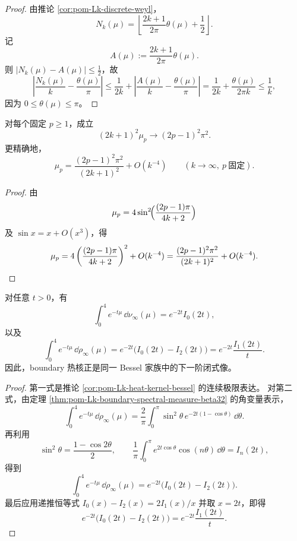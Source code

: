 \begin{proof}
由推论 \ref{cor:pom-Lk-discrete-weyl}，
\[
N_k(\mu)=\left\lfloor \frac{2k+1}{2\pi}\theta(\mu)+\frac12\right\rfloor.
\]
记
\[
A(\mu):=\frac{2k+1}{2\pi}\theta(\mu).
\]
则 \(|N_k(\mu)-A(\mu)|\le \frac12\)，故
\[
\left|\frac{N_k(\mu)}{k}-\frac{\theta(\mu)}{\pi}\right|
\le
\frac{1}{2k}
+
\left|\frac{A(\mu)}{k}-\frac{\theta(\mu)}{\pi}\right|
=
\frac{1}{2k}+\frac{\theta(\mu)}{2\pi k}
\le \frac{1}{k},
\]
因为 \(0\le \theta(\mu)\le \pi\)。
\end{proof}

\begin{corollary}[固定量子编号的硬边极限]\label{cor:conclusion-Lk-fixed-index-hard-edge}
对每个固定 \(p\ge 1\)，成立
\[
(2k+1)^2\mu_p\longrightarrow (2p-1)^2\pi^2.
\]
更精确地，
\[
\mu_p=
\frac{(2p-1)^2\pi^2}{(2k+1)^2}+O(k^{-4})
\qquad
(k\to\infty,\ p\ \text{固定}).
\]
\end{corollary}

\begin{proof}
由
\[
\mu_p=4\sin^2\!\Bigl(\frac{(2p-1)\pi}{4k+2}\Bigr)
\]
及 \(\sin x=x+O(x^3)\)，得
\[
\mu_p=
4\left(\frac{(2p-1)\pi}{4k+2}\right)^2+O(k^{-4})
=
\frac{(2p-1)^2\pi^2}{(2k+1)^2}+O(k^{-4}).
\qedhere
\]
\end{proof}

\begin{theorem}\label{thm:conclusion-Lk-bulk-boundary-bessel-duality}
对任意 \(t>0\)，有
\[
\int_0^4 e^{-t\mu}\,\dd\nu_\infty(\mu)=e^{-2t}I_0(2t),
\]
以及
\[
\int_0^4 e^{-t\mu}\,\dd\rho_\infty(\mu)
=
e^{-2t}\bigl(I_0(2t)-I_2(2t)\bigr)
=
e^{-2t}\frac{I_1(2t)}{t}.
\]
因此，boundary 热核正是同一 Bessel 家族中的下一阶闭式像。
\end{theorem}

\begin{proof}
第一式是推论 \ref{cor:pom-Lk-heat-kernel-bessel} 的连续极限表达。
对第二式，由定理 \ref{thm:pom-Lk-boundary-spectral-measure-beta32} 的角变量表示，
\[
\int_0^4 e^{-t\mu}\,\dd\rho_\infty(\mu)
=
\frac{2}{\pi}\int_0^\pi \sin^2\theta\,e^{-2t(1-\cos\theta)}\,\dd\theta.
\]
再利用
\[
\sin^2\theta=\frac{1-\cos 2\theta}{2},
\qquad
\frac{1}{\pi}\int_0^\pi e^{2t\cos\theta}\cos(n\theta)\,\dd\theta=I_n(2t),
\]
得到
\[
\int_0^4 e^{-t\mu}\,\dd\rho_\infty(\mu)
=
e^{-2t}\bigl(I_0(2t)-I_2(2t)\bigr).
\]
最后应用递推恒等式 \(I_0(x)-I_2(x)=2I_1(x)/x\) 并取 \(x=2t\)，即得
\[
e^{-2t}\bigl(I_0(2t)-I_2(2t)\bigr)=e^{-2t}\frac{I_1(2t)}{t}.
\]
\end{proof}

